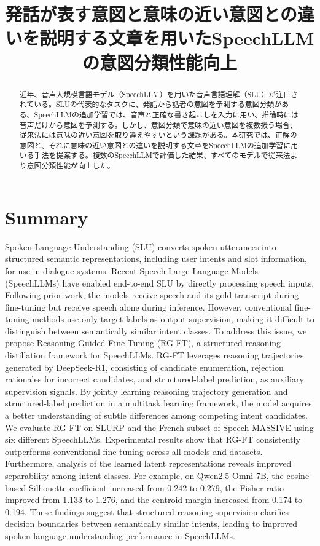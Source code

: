 \documentclass[11pt,a4paper]{ltjsarticle}
\title{発話が表す意図と意味の近い意図との違いを説明する文章を用いたSpeechLLMの意図分類性能向上}
\author{}
\date{}
\begin{document}
\maketitle

\begin{abstract}
近年、音声大規模言語モデル（SpeechLLM）を用いた音声言語理解（SLU）が注目されている。SLUの代表的なタスクに、発話から話者の意図を予測する意図分類がある。SpeechLLMの追加学習では、音声と正確な書き起こしを入力に用い、推論時には音声だけから意図を予測する。しかし、意図分類で意味の近い意図を複数扱う場合、従来法には意味の近い意図を取り違えやすいという課題がある。本研究では、正解の意図と、それに意味の近い意図との違いを説明する文章をSpeechLLMの追加学習に用いる手法を提案する。複数のSpeechLLMで評価した結果、すべてのモデルで従来法より意図分類性能が向上した。
\end{abstract}

\section*{Summary}
Spoken Language Understanding (SLU) converts spoken utterances into structured semantic representations, including user intents and slot information, for use in dialogue systems. Recent Speech Large Language Models (SpeechLLMs) have enabled end-to-end SLU by directly processing speech inputs. Following prior work, the models receive speech and its gold transcript during fine-tuning but receive speech alone during inference. However, conventional fine-tuning methods use only target labels as output supervision, making it difficult to distinguish between semantically similar intent classes. To address this issue, we propose Reasoning-Guided Fine-Tuning (RG-FT), a structured reasoning distillation framework for SpeechLLMs. RG-FT leverages reasoning trajectories generated by DeepSeek-R1, consisting of candidate enumeration, rejection rationales for incorrect candidates, and structured-label prediction, as auxiliary supervision signals. By jointly learning reasoning trajectory generation and structured-label prediction in a multitask learning framework, the model acquires a better understanding of subtle differences among competing intent candidates. We evaluate RG-FT on SLURP and the French subset of Speech-MASSIVE using six different SpeechLLMs. Experimental results show that RG-FT consistently outperforms conventional fine-tuning across all models and datasets. Furthermore, analysis of the learned latent representations reveals improved separability among intent classes. For example, on Qwen2.5-Omni-7B, the cosine-based Silhouette coefficient increased from 0.242 to 0.279, the Fisher ratio improved from 1.133 to 1.276, and the centroid margin increased from 0.174 to 0.194. These findings suggest that structured reasoning supervision clarifies decision boundaries between semantically similar intents, leading to improved spoken language understanding performance in SpeechLLMs.
\end{document}
